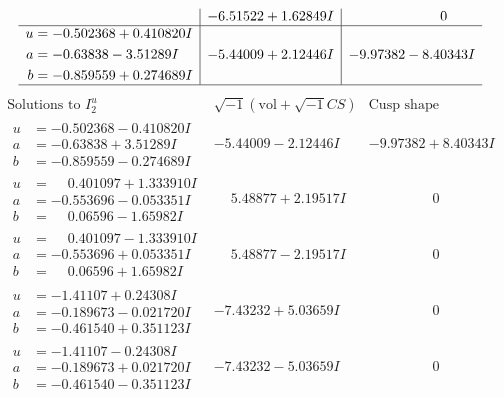 \documentclass[1p]{elsarticle_modified}
\theoremstyle{definition}
\newcommand{\I}{\sqrt{-1}}
\begin{document}
$$\begin{array}{c|c|c}
 & -6.51522 + 1.62849 I & \phantom{-0.000000 } 0 \\ \hline\begin{aligned}
u &= -0.502368 + 0.410820 I \\
a &= -0.63838 - 3.51289 I \\
b &= -0.859559 + 0.274689 I\end{aligned}
 & -5.44009 + 2.12446 I & -9.97382 - 8.40343 I\\
 \hline 
 \end{array}$$\newpage$$\begin{array}{c|c|c}  
\text{Solutions to }I^u_{2}& \I (\text{vol} + \sqrt{-1}CS) & \text{Cusp shape}\\
 \hline 
\begin{aligned}
u &= -0.502368 - 0.410820 I \\
a &= -0.63838 + 3.51289 I \\
b &= -0.859559 - 0.274689 I\end{aligned}
 & -5.44009 - 2.12446 I & -9.97382 + 8.40343 I \\ \hline\begin{aligned}
u &= \phantom{-}0.401097 + 1.333910 I \\
a &= -0.553696 - 0.053351 I \\
b &= \phantom{-}0.06596 - 1.65982 I\end{aligned}
 & \phantom{-}5.48877 + 2.19517 I & \phantom{-0.000000 } 0 \\ \hline\begin{aligned}
u &= \phantom{-}0.401097 - 1.333910 I \\
a &= -0.553696 + 0.053351 I \\
b &= \phantom{-}0.06596 + 1.65982 I\end{aligned}
 & \phantom{-}5.48877 - 2.19517 I & \phantom{-0.000000 } 0 \\ \hline\begin{aligned}
u &= -1.41107 + 0.24308 I \\
a &= -0.189673 - 0.021720 I \\
b &= -0.461540 + 0.351123 I\end{aligned}
 & -7.43232 + 5.03659 I & \phantom{-0.000000 } 0 \\ \hline\begin{aligned}
u &= -1.41107 - 0.24308 I \\
a &= -0.189673 + 0.021720 I \\
b &= -0.461540 - 0.351123 I\end{aligned}
 & -7.43232 - 5.03659 I & \phantom{-0.000000 } 0 \\ \hline\begin{aligned}

\end{aligned}
\end{array}$$
\end{document}
